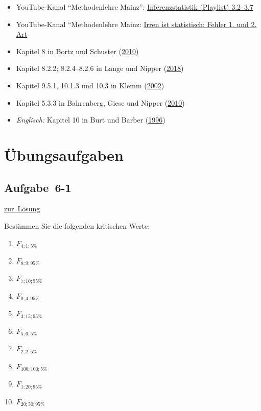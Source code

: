 \documentclass[
  11pt,
  ngerman,
  a4paper,
]{report}
\providecommand{\tightlist}{%
  \setlength{\itemsep}{0pt}\setlength{\parskip}{0pt}}
\begin{document}
\begin{itemize}
\tightlist
\item
  YouTube-Kanal \enquote{Methodenlehre Mainz}: \href{https://www.youtube.com/watch?v=pCCvA28l9es&index=17&list=PLSFgFMMLqanK_DUMJycmua0ODSaKq28Gb}{Inferenzstatistik (Playlist) 3.2--3.7}
\item
  YouTube-Kanal ``Methodenlehre Mainz: \href{https://www.youtube.com/watch?v=q1jkbDMwflg}{Irren ist statistisch: Fehler 1. und 2. Art}
\item
  Kapitel 8 in Bortz und Schuster (\protect\hyperlink{ref-bortz}{2010})
\item
  Kapitel 8.2.2; 8.2.4--8.2.6 in Lange und Nipper (\protect\hyperlink{ref-delange}{2018})
\item
  Kapitel 9.5.1, 10.1.3 und 10.3 in Klemm (\protect\hyperlink{ref-klemm}{2002})
\item
  Kapitel 5.3.3 in Bahrenberg, Giese und Nipper (\protect\hyperlink{ref-bahrenberg}{2010})
\item
  \emph{Englisch:} Kapitel 10 in Burt und Barber (\protect\hyperlink{ref-burt}{1996})
\end{itemize}

\hypertarget{uxfcbungsaufgaben-5}{%
\section*{Übungsaufgaben}\label{uxfcbungsaufgaben-5}}

\nopagebreak

\hypertarget{aufgabe-6-1}{%
\subsection{Aufgabe~6-1}\label{aufgabe-6-1}}

\protect\hyperlink{loesung-6-1}{zur~Lösung}

Bestimmen Sie die folgenden kritischen Werte:

\begin{enumerate}
\def\labelenumi{\alph{enumi})}
\tightlist
\item
  \(F_{4;1;5\%}\)
\item
  \(F_{8;9;95\%}\)
\item
  \(F_{7;10;95\%}\)
\item
  \(F_{9;4;95\%}\)
\item
  \(F_{3;15;95\%}\)
\item
  \(F_{5;6;5\%}\)
\item
  \(F_{2;2;5\%}\)
\item
  \(F_{100;100;5\%}\)
\item
  \(F_{1;20;95\%}\)
\item
  \(F_{20;50;95\%}\)
\end{enumerate}
\end{document}
